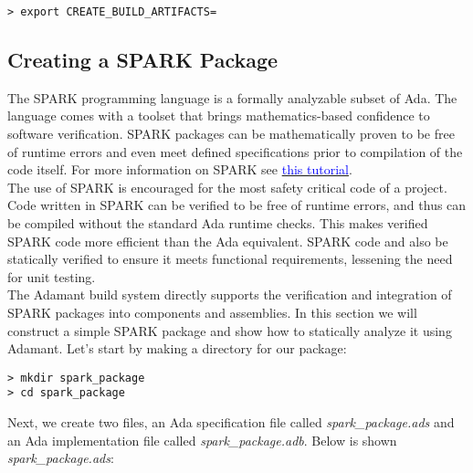 \vspace{5mm} %
\begin{verbatim}
> export CREATE_BUILD_ARTIFACTS=
\end{verbatim}
\vspace{5mm} %

\subsection{Creating a SPARK Package} \label{Creating a SPARK Package}

The SPARK programming language is a formally analyzable subset of Ada. The language comes with a toolset that brings mathematics-based confidence to software verification. SPARK packages can be mathematically proven to be free of runtime errors and even meet defined specifications prior to compilation of the code itself. For more information on SPARK see \href{https://learn.adacore.com/courses/intro-to-spark/index.html}{\textcolor{blue}{this tutorial}}. \\ 

The use of SPARK is encouraged for the most safety critical code of a project. Code written in SPARK can be verified to be free of runtime errors, and thus can be compiled without the standard Ada runtime checks. This makes verified SPARK code more efficient than the Ada equivalent. SPARK code and also be statically verified to ensure it meets functional requirements, lessening the need for unit testing. \\

The Adamant build system directly supports the verification and integration of SPARK packages into components and assemblies. In this section we will construct a simple SPARK package and show how to statically analyze it using Adamant. Let's start by making a directory for our package:

\vspace{5mm} %
\begin{verbatim}
> mkdir spark_package 
> cd spark_package 
\end{verbatim}
\vspace{5mm} %

Next, we create two files, an Ada specification file called \textit{spark\_package.ads} and an Ada implementation file called \textit{spark\_package.adb}. Below is shown \textit{spark\_package.ads}:


